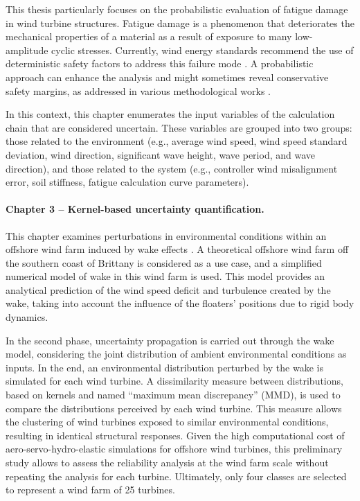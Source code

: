 This thesis particularly focuses on the probabilistic evaluation of fatigue damage in wind turbine structures. 
Fatigue damage is a phenomenon that deteriorates the mechanical properties of a material as a result of exposure to many low-amplitude cyclic stresses. 
Currently, wind energy standards recommend the use of deterministic safety factors to address this failure mode \citep{dnv_loads_2016,iec_2019}. 
A probabilistic approach can enhance the analysis and might sometimes reveal conservative safety margins, as addressed in various methodological works \citep{huchet_2018,lataniotis_2019,petrovska_2022}.

In this context, this chapter enumerates the input variables of the calculation chain that are considered uncertain. 
These variables are grouped into two groups: those related to the environment (e.g., average wind speed, wind speed standard deviation, wind direction, significant wave height, wave period, and wave direction), 
and those related to the system (e.g., controller wind misalignment error, soil stiffness, fatigue calculation curve parameters).


\paragraph{Chapter 3 -- Kernel-based uncertainty quantification.} 
This chapter examines perturbations in environmental conditions within an offshore wind farm induced by wake effects \citep{larsen_2008_wake}. 
A theoretical offshore wind farm off the southern coast of Brittany is considered as a use case, and a simplified numerical model of wake in this wind farm is used. 
This model provides an analytical prediction of the wind speed deficit and turbulence created by the wake, taking into account the influence of the floaters' positions due to rigid body dynamics. 

In the second phase, uncertainty propagation is carried out through the wake model, considering the joint distribution of ambient environmental conditions as inputs. 
In the end, an environmental distribution perturbed by the wake is simulated for each wind turbine. 
A dissimilarity measure between distributions, based on kernels and named ``maximum mean discrepancy'' (MMD), is used to compare the distributions perceived by each wind turbine. 
This measure allows the clustering of wind turbines exposed to similar environmental conditions, resulting in identical structural responses. 
Given the high computational cost of aero-servo-hydro-elastic simulations for offshore wind turbines, this preliminary study allows to assess the reliability analysis at the wind farm scale without repeating the analysis for each turbine. 
Ultimately, only four classes are selected to represent a wind farm of 25 turbines.



